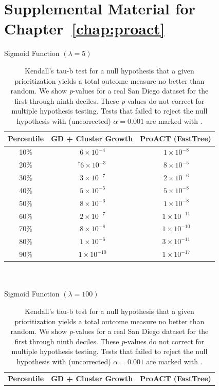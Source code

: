 \chapter{Supplemental Material for Chapter~\ref{chap:proact}}
\label{chap:proact-sup}
\clearpage

\begin{table}[!ht] %
\caption[Kendall's Tau-b Test \textit{p}-Values (Sigmoid Functions)]{Kendall's tau-b test for a null hypothesis that a given prioritization yields a total outcome measure no better than random. We show \textit{p}-values for a real San Diego dataset for the first through ninth deciles. These \textit{p}-values do not correct for multiple hypothesis testing. Tests that failed to reject the null hypothesis with (uncorrected) $\alpha=0.001$ are marked with \dag.}
\vspace{-0.25in}
\begin{center}
Sigmoid Function $(\lambda=5)$\\
\begin{tabular}{|c|c|c|}
\hline
\textbf{Percentile} & \textbf{GD + Cluster Growth} & \textbf{ProACT (FastTree)}\\
\hline
10\% & $^{\ }6\times10^{-4}$ & $^{\ }1\times10^{-8}$\\
\hline
20\% & $^\dag6\times10^{-3}$ & $^{\ }8\times10^{-5}$\\
\hline
30\% & $^{\ }3\times10^{-7}$ & $^{\ }2\times10^{-6}$\\
\hline
40\% & $^{\ }5\times10^{-5}$ & $^{\ }5\times10^{-8}$\\
\hline
50\% & $^{\ }8\times10^{-6}$ & $^{\ }1\times10^{-8}$\\
\hline
60\% & $^{\ }2\times10^{-7}$ & $^{\ }1\times10^{-11}$\\
\hline
70\% & $^{\ }8\times10^{-8}$ & $^{\ }1\times10^{-10}$\\
\hline
80\% & $^{\ }1\times10^{-6}$ & $^{\ }3\times10^{-11}$\\
\hline
90\% & $^{\ }1\times10^{-10}$ & $^{\ }1\times10^{-17}$\\
\hline
\end{tabular}
~\\~\\
Sigmoid Function $(\lambda=100)$\\
\begin{tabular}{|c|c|c|}
\hline
\textbf{Percentile} & \textbf{GD + Cluster Growth} & \textbf{ProACT (FastTree)}\\

\end{tabular}
\end{center}
\end{table}
